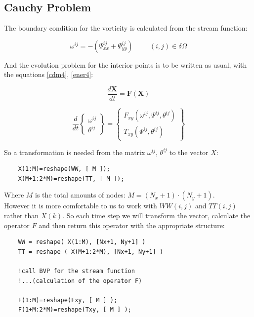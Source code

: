 \subsection{Cauchy Problem}

The boundary condition for the vorticity is calculated from the stream function: 

\begin {equation} \label{BCs200}
\omega^{ij}= - (\Psi^{ij} _{xx} + \Psi^{ij} _{yy}) \hspace{1cm} (i,j)\in \delta \Omega
\end{equation}

And the evolution problem for the interior points is to be written as usual,
with the equations \ref{cdm4}, \ref{ener4}:

\begin {equation} \label{Cauchy}
\frac{d \mathbf{X}}{dt}= \mathbf{F} (\mathbf{X}) 
\end{equation}

\begin {equation} \label{Cauchy2}
\frac{d}{dt} \left \{ {\begin{array}{c} \omega^{ij} \\ \theta^{ij} \end{array}}
\right \}= \left \{ {\begin{array}{c} F_{xy} (\omega^{ij}, \Psi^{ij},
\theta^{ij}) \\
T_{xy}(\Psi^{ij}, \theta^{ij})
\end{array}} \right \}
\end{equation}


So a transformation is needed from the matrix $\omega^{ij}$, $\theta^{ij}$ to the vector $X$: 

\begin{blueframed}
\begin{lstlisting}
	X(1:M)=reshape(WW, [ M ]);
	X(M+1:2*M)=reshape(TT, [ M ]);
\end{lstlisting}
\end{blueframed}

Where $M$ is the total amounts of nodes: $M=(N_x+1)\cdot(N_y+1)$. \\

However it is more comfortable to us to work with $WW(i,j)$ and $TT(i,j)$ rather
than $X(k)$. So each time step we will transform the vector, calculate the
operator $F$ and then return this operator with the appropriate structure: 

\begin{blueframed}
\begin{lstlisting}
	WW = reshape( X(1:M), [Nx+1, Ny+1] )
	TT = reshape ( X(M+1:2*M), [Nx+1, Ny+1] )
	
	!call BVP for the stream function
	!...(calculation of the operator F)
	
	F(1:M)=reshape(Fxy, [ M ] );
	F(1+M:2*M)=reshape(Txy, [ M ] );
\end{lstlisting}
\end{blueframed}


